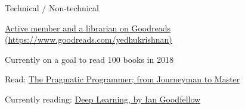 \begin{cventries}
  \cventry
    {Technical / Non-technical}
    {}
    {}
    {}
    {
      \begin{cvitems}
        \item {\href{https://www.goodreads.com/yedhukrishnan}{Active member and a librarian on Goodreads (https://www.goodreads.com/yedhukrishnan)}}
        \item {Currently on a goal to read 100 books in 2018}
        \item {Read: \href{https://www.goodreads.com/book/show/4099.The_Pragmatic_Programmer}{The Pragmatic Programmer; from Journeyman to Master}}
        \item {Currently reading: \href{https://www.goodreads.com/book/show/30422361-deep-learning}{Deep Learning, by Ian Goodfellow}}
      \end{cvitems}
    }
\end{cventries}
